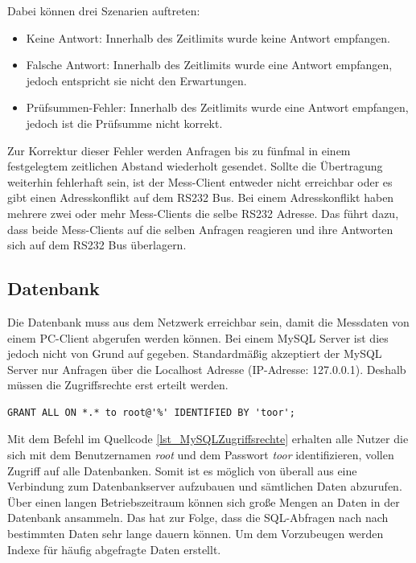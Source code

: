 Dabei können drei Szenarien auftreten:
\begin{itemize}
\item Keine Antwort: Innerhalb des Zeitlimits wurde keine Antwort empfangen.
\item Falsche Antwort: Innerhalb des Zeitlimits wurde eine Antwort empfangen, jedoch entspricht sie nicht den Erwartungen.
\item Prüfsummen-Fehler: Innerhalb des Zeitlimits wurde eine Antwort empfangen, jedoch ist die Prüfsumme nicht korrekt.
\end{itemize}

Zur Korrektur dieser Fehler werden Anfragen bis zu fünfmal in einem festgelegtem zeitlichen Abstand wiederholt gesendet. Sollte die Übertragung weiterhin fehlerhaft sein, ist der Mess-Client entweder nicht erreichbar oder es gibt einen Adresskonflikt auf dem RS232 Bus. Bei einem Adresskonflikt haben mehrere zwei oder mehr Mess-Clients die selbe RS232 Adresse. Das führt dazu, dass beide Mess-Clients auf die selben Anfragen reagieren und ihre Antworten sich auf dem RS232 Bus überlagern.




\subsection{Datenbank}

Die Datenbank muss aus dem Netzwerk erreichbar sein, damit die Messdaten von einem PC-Client abgerufen werden können. Bei einem MySQL Server ist dies jedoch nicht von Grund auf gegeben. Standardmäßig akzeptiert der MySQL Server nur Anfragen über die Localhost Adresse (IP-Adresse: 127.0.0.1). Deshalb müssen die Zugriffsrechte erst erteilt werden.\\

\begin{lstlisting}[caption={MySQL Zugriffsrechte},label=lst_MySQLZugriffsrechte]
GRANT ALL ON *.* to root@'%' IDENTIFIED BY 'toor';
\end{lstlisting}

Mit dem Befehl im Quellcode \ref{lst_MySQLZugriffsrechte} erhalten alle Nutzer die sich mit dem Benutzernamen \textit{root} und dem Passwort \textit{toor} identifizieren, vollen Zugriff auf alle Datenbanken. Somit ist es möglich von überall aus eine Verbindung zum Datenbankserver aufzubauen und sämtlichen Daten abzurufen.\\

Über einen langen Betriebszeitraum können sich große Mengen an Daten in der Datenbank ansammeln. Das hat zur Folge, dass die SQL-Abfragen nach nach bestimmten Daten sehr lange dauern können. Um dem Vorzubeugen werden Indexe für häufig abgefragte Daten erstellt.\\

